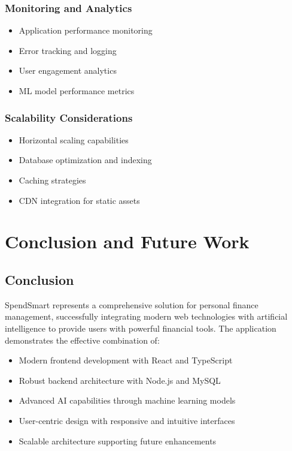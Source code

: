 \documentclass[12pt,a4paper]{article}
\begin{document}
\subsubsection{Monitoring and Analytics}
\begin{itemize}
    \item Application performance monitoring
    \item Error tracking and logging
    \item User engagement analytics
    \item ML model performance metrics
\end{itemize}

\subsubsection{Scalability Considerations}
\begin{itemize}
    \item Horizontal scaling capabilities
    \item Database optimization and indexing
    \item Caching strategies
    \item CDN integration for static assets
\end{itemize}

\section{Conclusion and Future Work}

\subsection{Conclusion}

SpendSmart represents a comprehensive solution for personal finance management, successfully integrating modern web technologies with artificial intelligence to provide users with powerful financial tools. The application demonstrates the effective combination of:

\begin{itemize}
    \item Modern frontend development with React and TypeScript
    \item Robust backend architecture with Node.js and MySQL
    \item Advanced AI capabilities through machine learning models
    \item User-centric design with responsive and intuitive interfaces
    \item Scalable architecture supporting future enhancements
\end{itemize}
\end{document}
